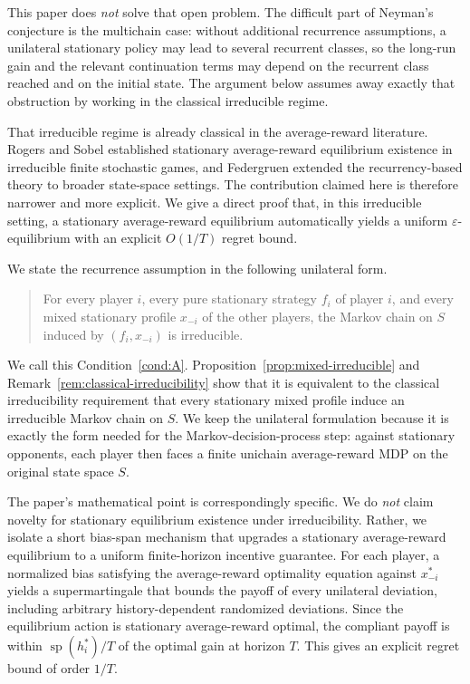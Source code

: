 \documentclass[11pt]{article}
\theoremstyle{definition}
\newcommand{\1}{\mathbf{1}}
\DeclareMathOperator{\spn}{sp}
\begin{document}
This paper does \emph{not} solve that open problem. The difficult part of Neyman's conjecture is the multichain case: without additional recurrence assumptions, a unilateral stationary policy may lead to several recurrent classes, so the long-run gain and the relevant continuation terms may depend on the recurrent class reached and on the initial state. The argument below assumes away exactly that obstruction by working in the classical irreducible regime.

That irreducible regime is already classical in the average-reward literature. Rogers \cite{Rogers1969} and Sobel \cite{Sobel1971} established stationary average-reward equilibrium existence in irreducible finite stochastic games, and Federgruen \cite{Federgruen1978} extended the recurrency-based theory to broader state-space settings. The contribution claimed here is therefore narrower and more explicit. We give a direct proof that, in this irreducible setting, a stationary average-reward equilibrium automatically yields a uniform $\varepsilon$-equilibrium with an explicit $O(1/T)$ regret bound.

We state the recurrence assumption in the following unilateral form.

\begin{quote}
For every player $i$, every pure stationary strategy $f_i$ of player $i$, and every mixed stationary profile $x_{-i}$ of the other players, the Markov chain on $S$ induced by $(f_i,x_{-i})$ is irreducible.
\end{quote}

We call this Condition~\ref{cond:A}. Proposition~\ref{prop:mixed-irreducible} and Remark~\ref{rem:classical-irreducibility} show that it is equivalent to the classical irreducibility requirement that every stationary mixed profile induce an irreducible Markov chain on $S$. We keep the unilateral formulation because it is exactly the form needed for the Markov-decision-process step: against stationary opponents, each player then faces a finite unichain average-reward MDP on the original state space $S$.

The paper's mathematical point is correspondingly specific. We do \emph{not} claim novelty for stationary equilibrium existence under irreducibility. Rather, we isolate a short bias-span mechanism that upgrades a stationary average-reward equilibrium to a uniform finite-horizon incentive guarantee. For each player, a normalized bias satisfying the average-reward optimality equation against $x^*_{-i}$ yields a supermartingale that bounds the payoff of every unilateral deviation, including arbitrary history-dependent randomized deviations. Since the equilibrium action is stationary average-reward optimal, the compliant payoff is within $\spn(h_i^*)/T$ of the optimal gain at horizon $T$. This gives an explicit regret bound of order $1/T$.
\end{document}
